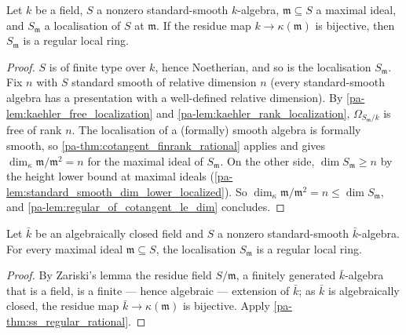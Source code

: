 \begin{theorem}
  \label{pa-thm:ss_regular_rational}
  \leanok

  Let \(k\) be a field, \(S\) a nonzero standard-smooth \(k\)-algebra,
  \(\mathfrak m \subseteq S\) a maximal ideal, and \(S_{\mathfrak m}\) a
  localisation of \(S\) at \(\mathfrak m\). If the residue map
  \(k \to \kappa(\mathfrak m)\) is bijective, then \(S_{\mathfrak m}\) is a
  regular local ring.
\end{theorem}
\begin{proof}
  \leanok
  \(S\) is of finite type over \(k\), hence Noetherian, and so is the
  localisation \(S_{\mathfrak m}\). Fix \(n\) with \(S\) standard smooth of
  relative dimension \(n\) (every standard-smooth algebra has a presentation
  with a well-defined relative dimension). By
  \ref{pa-lem:kaehler_free_localization} and \ref{pa-lem:kaehler_rank_localization},
  \(\Omega_{S_{\mathfrak m}/k}\) is free of rank \(n\). The localisation of a
  (formally) smooth algebra is formally smooth, so
  \ref{pa-thm:cotangent_finrank_rational} applies and gives
  \(\dim_\kappa \mathfrak m/\mathfrak m^2 = n\) for the maximal ideal of
  \(S_{\mathfrak m}\). On the other side,
  \(\dim S_{\mathfrak m} \geq n\) by the height lower bound at maximal ideals
  (\ref{pa-lem:standard_smooth_dim_lower_localized}). So
  \(\dim_\kappa \mathfrak m/\mathfrak m^2 = n \leq \dim S_{\mathfrak m}\),
  and \ref{pa-lem:regular_of_cotangent_le_dim} concludes.
\end{proof}

\begin{theorem}
  \label{pa-thm:ss_regular_closed}
  \leanok

  Let \(\bar k\) be an algebraically closed field and \(S\) a nonzero
  standard-smooth \(\bar k\)-algebra. For every maximal ideal
  \(\mathfrak m \subseteq S\), the localisation \(S_{\mathfrak m}\) is a
  regular local ring.
\end{theorem}
\begin{proof}
  \leanok
  By Zariski's lemma the residue field \(S/\mathfrak m\), a finitely generated
  \(\bar k\)-algebra that is a field, is a finite --- hence algebraic ---
  extension of \(\bar k\); as \(\bar k\) is algebraically closed, the residue
  map \(\bar k \to \kappa(\mathfrak m)\) is bijective. Apply
  \ref{pa-thm:ss_regular_rational}.
\end{proof}


